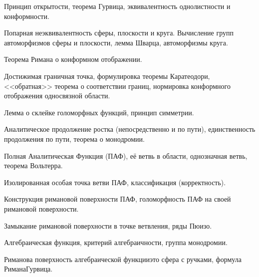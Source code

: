 \documentclass[a4paper]{article}
\begin{document}
\begin{nums}{-2}
\item Принцип открытости, теорема Гурвица, эквивалентность  однолистности и конформности.
\item Попарная неэквивалентность сферы, плоскости и круга. Вычисление групп автоморфизмов
      сферы и плоскости, лемма Шварца, автоморфизмы круга.
\item Теорема Римана о конформном отображении.
\item Достижимая граничная точка, формулировка теоремы Каратеодори, <<обратная>> теорема о
соответствии границ, нормировка конформного отображения односвязной области.
\item Лемма о склейке голоморфных функций, принцип симметрии.
\item Аналитическое продолжение ростка (непосредственно и по пути), единственность продолжения по пути,
теорема о монодромии.
\item Полная Аналитическая Функция (ПАФ), её ветвь в области, однозначная ветвь, теорема Вольтерра.
\item Изолированная особая точка ветви ПАФ, классификация (корректность).
\item Конструкция римановой поверхности ПАФ, голоморфность ПАФ на своей римановой  поверхности.
\item Замыкание римановой поверхности в точке ветвления, ряды Пюизо.
\item Алгебраическая функция, критерий алгебраичности, группа монодромии.
\item Риманова поверхность алгебраической функции\т это сфера с ручками, формула Римана\ч Гурвица.
\end{nums}

\pagebreak
\end{document}
